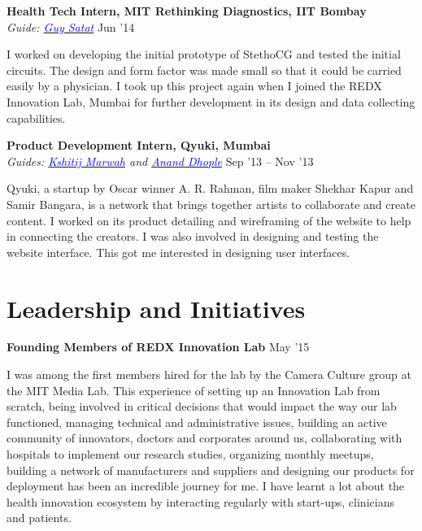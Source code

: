 \documentclass[margin,line]{res}
\newenvironment{list1}{
  \begin{list}{\ding{113}}{%
      \setlength{\itemsep}{0in}
      \setlength{\parsep}{0in} \setlength{\parskip}{0in}
      \setlength{\topsep}{0in} \setlength{\partopsep}{0in} 
      \setlength{\leftmargin}{0.17in}}}{\end{list}}
\begin{document}
\begin{resume}
{\bf Health Tech Intern, MIT Rethinking Diagnostics, IIT Bombay} \\
{\em Guide: \href{http://web.media.mit.edu/~guysatat/}{\textcolor{blue}{Guy Satat}}} \hfill {Jun '14} \\
\vspace*{-.13in}
\begin{list1}
\item[]
I worked on developing the initial prototype of StethoCG and tested the initial circuits. The design and form factor was made small so that it could be carried easily by a physician. I took up this project again when I joined the REDX Innovation Lab, Mumbai for further development in its design and data collecting capabilities.
\end{list1}

{\bf Product Development Intern, Qyuki, Mumbai} \\
{\em Guides: \href{http://www.kshitijmarwah.com}{\textcolor{blue}{Kshitij Marwah}} and \href{https://www.linkedin.com/in/ananddhople}{\textcolor{blue}{Anand Dhople}}} \hfill {Sep '13 -- Nov '13} \\
\vspace*{-.13in}
\begin{list1}
\item[]
Qyuki, a startup by Oscar winner A. R. Rahman, film maker Shekhar Kapur and Samir Bangara, is a network that brings together artists to collaborate and create content. I worked on its product detailing and wireframing of the website to help in connecting the creators. I was also involved in designing and testing the website interface. This got me interested in designing user interfaces. 
\end{list1}

\section{\sc Leadership and Initiatives}

{\bf Founding Members of REDX Innovation Lab} \hfill {May '15} \\
\vspace*{-.13in}
\begin{list1}
\item[]
I was among the first members hired for the lab by the Camera Culture group at the MIT Media Lab. This experience of setting up an Innovation Lab from scratch, being involved in critical decisions that would impact the way our lab functioned, managing technical and administrative issues, building an active community of innovators, doctors and corporates around us, collaborating with hospitals to implement our research studies, organizing monthly meetups, building a network of manufacturers and suppliers and designing our products for deployment has been an incredible journey for me. I have learnt a lot about the health innovation ecosystem by interacting regularly with start-ups, clinicians and patients.
\end{list1}


\end{resume}
\end{document}

